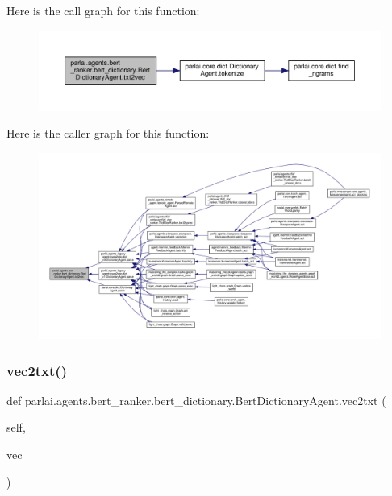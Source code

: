 Here is the call graph for this function\+:
\nopagebreak
\begin{figure}[H]
\begin{center}
\leavevmode
\includegraphics[width=350pt]{classparlai_1_1agents_1_1bert__ranker_1_1bert__dictionary_1_1BertDictionaryAgent_a407dcd1aa927f8065334a825b2d099d9_cgraph}
\end{center}
\end{figure}
Here is the caller graph for this function\+:
\nopagebreak
\begin{figure}[H]
\begin{center}
\leavevmode
\includegraphics[width=350pt]{classparlai_1_1agents_1_1bert__ranker_1_1bert__dictionary_1_1BertDictionaryAgent_a407dcd1aa927f8065334a825b2d099d9_icgraph}
\end{center}
\end{figure}
\mbox{\label{classparlai_1_1agents_1_1bert__ranker_1_1bert__dictionary_1_1BertDictionaryAgent_a6269b15dc01bfaac5dd1b5da995f2f0f}} 
\subsubsection{\texorpdfstring{vec2txt()}{vec2txt()}}
{\footnotesize\ttfamily def parlai.\+agents.\+bert\+\_\+ranker.\+bert\+\_\+dictionary.\+Bert\+Dictionary\+Agent.\+vec2txt (\begin{DoxyParamCaption}\item[{}]{self,  }\item[{}]{vec }\end{DoxyParamCaption})}



